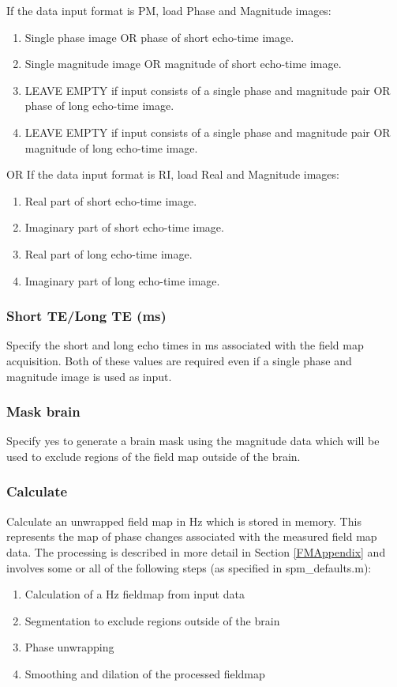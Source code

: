 If the data input format is PM, load Phase and Magnitude images:
\begin{enumerate}
\item{Single phase image OR phase of short echo-time image.}
\item{Single magnitude image OR magnitude of short echo-time image.}
\item{LEAVE EMPTY if input consists of a single phase and magnitude pair OR phase of long echo-time image.}
\item{LEAVE EMPTY if input consists of a single phase and magnitude pair OR magnitude of long echo-time image.}
\end{enumerate}
OR 
If the data input format is RI, load Real and Magnitude images:
\begin{enumerate}
\item{Real part of short echo-time image.}
\item{Imaginary part of short echo-time image.}
\item{Real part of long echo-time image.}
\item{Imaginary part of long echo-time image.}
\end{enumerate}

\subsubsection{Short TE/Long TE (ms)}
Specify the short and long echo times in ms associated with the field map acquisition. Both of these values are required even if a single phase and magnitude image is used as input.

\subsubsection{Mask brain}
Specify yes to generate a brain mask using the magnitude data which will be used to exclude regions of the field map outside of the brain.

\subsubsection{Calculate}
Calculate an unwrapped field map in Hz which is stored in memory. This represents the map of phase changes associated with the measured field map data. The processing is described in more detail in Section \ref{FMAppendix} and involves some or all of the following steps (as specified in spm\_defaults.m): 
\begin{enumerate}
\item{Calculation of a Hz fieldmap from input data}
\item{Segmentation to exclude regions outside of the brain}
\item{Phase unwrapping}
\item{Smoothing and dilation of the processed fieldmap}
\end{enumerate}

